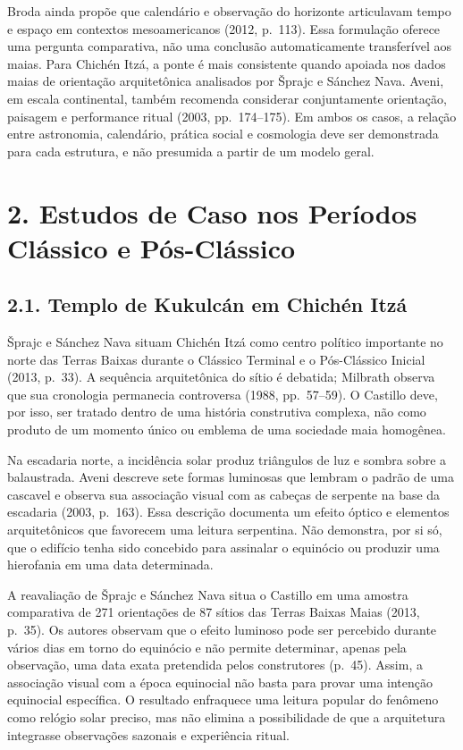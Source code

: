\documentclass[
  brazilian,
]{article}
\begin{document}
Broda ainda propõe que calendário e observação do horizonte articulavam
tempo e espaço em contextos mesoamericanos (2012, p.~113). Essa
formulação oferece uma pergunta comparativa, não uma conclusão
automaticamente transferível aos maias. Para Chichén Itzá, a ponte é
mais consistente quando apoiada nos dados maias de orientação
arquitetônica analisados por Šprajc e Sánchez Nava. Aveni, em escala
continental, também recomenda considerar conjuntamente orientação,
paisagem e performance ritual (2003, pp.~174--175). Em ambos os casos, a
relação entre astronomia, calendário, prática social e cosmologia deve
ser demonstrada para cada estrutura, e não presumida a partir de um
modelo geral.

\section{2. Estudos de Caso nos Períodos Clássico e
Pós-Clássico}\label{estudos-de-caso-nos-peruxedodos-cluxe1ssico-e-puxf3s-cluxe1ssico}

\subsection{2.1. Templo de Kukulcán em Chichén
Itzá}\label{templo-de-kukulcuxe1n-em-chichuxe9n-itzuxe1}

Šprajc e Sánchez Nava situam Chichén Itzá como centro político
importante no norte das Terras Baixas durante o Clássico Terminal e o
Pós-Clássico Inicial (2013, p.~33). A sequência arquitetônica do sítio é
debatida; Milbrath observa que sua cronologia permanecia controversa
(1988, pp.~57--59). O Castillo deve, por isso, ser tratado dentro de uma
história construtiva complexa, não como produto de um momento único ou
emblema de uma sociedade maia homogênea.

Na escadaria norte, a incidência solar produz triângulos de luz e sombra
sobre a balaustrada. Aveni descreve sete formas luminosas que lembram o
padrão de uma cascavel e observa sua associação visual com as cabeças de
serpente na base da escadaria (2003, p.~163). Essa descrição documenta
um efeito óptico e elementos arquitetônicos que favorecem uma leitura
serpentina. Não demonstra, por si só, que o edifício tenha sido
concebido para assinalar o equinócio ou produzir uma hierofania em uma
data determinada.

A reavaliação de Šprajc e Sánchez Nava situa o Castillo em uma amostra
comparativa de 271 orientações de 87 sítios das Terras Baixas Maias
(2013, p.~35). Os autores observam que o efeito luminoso pode ser
percebido durante vários dias em torno do equinócio e não permite
determinar, apenas pela observação, uma data exata pretendida pelos
construtores (p.~45). Assim, a associação visual com a época equinocial
não basta para provar uma intenção equinocial específica. O resultado
enfraquece uma leitura popular do fenômeno como relógio solar preciso,
mas não elimina a possibilidade de que a arquitetura integrasse
observações sazonais e experiência ritual.
\end{document}
